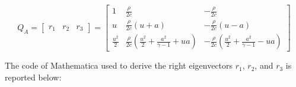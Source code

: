 \begin{equation}
    Q_A = \begin{bmatrix}
        r_1 & r_2 & r_3
    \end{bmatrix} = \begin{bmatrix}
        1             & \frac{\rho}{2c}                                                & - \frac{\rho}{2c}                                                \\
        u             & \frac{\rho}{2c} (u + a)                                        & - \frac{\rho}{2c} (u - a)                                        \\
        \frac{u^2}{2} & \frac{\rho}{2c} (\frac{u^2}{2} + \frac{a^2}{\gamma - 1} + u a) & - \frac{\rho}{2c} (\frac{u^2}{2} + \frac{a^2}{\gamma - 1} - u a)
    \end{bmatrix}
    \label{eq:matrix_Q_A}
\end{equation}

The code of Mathematica used to derive the right eigenvectors $r_1$, $r_2$, and $r_3$ is reported below:




